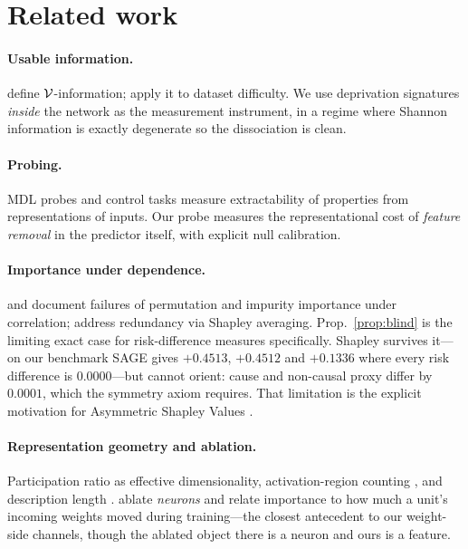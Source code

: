 \section{Related work}\label{sec:related}

\paragraph{Usable information.} \citet{xu2020theory} define
$\mathcal{V}$-information; \citet{ethayarajh2022understanding} apply it to dataset
difficulty. We use deprivation signatures \emph{inside} the network as the
measurement instrument, in a regime where Shannon information is exactly
degenerate so the dissociation is clean.

\paragraph{Probing.} MDL probes \citep{voita2020information} and control tasks
\citep{hewitt2019designing} measure extractability of properties from
representations of inputs. Our probe measures the representational cost of
\emph{feature removal} in the predictor itself, with explicit null calibration.

\paragraph{Importance under dependence.} \citet{strobl2008conditional} and
\citet{hooker2021unrestricted} document failures of permutation and impurity
importance under correlation; \citet{covert2020understanding} address redundancy
via Shapley averaging. Prop.~\ref{prop:blind} is the limiting exact case for
risk-difference measures specifically. Shapley survives it---on our benchmark
SAGE gives $+0.4513$, $+0.4512$ and $+0.1336$ where every risk difference is
$0.0000$---but cannot orient: cause and non-causal proxy differ by $0.0001$,
which the symmetry axiom requires. That limitation is the explicit motivation
for Asymmetric Shapley Values \citep{frye2020asymmetric}.

\paragraph{Representation geometry and ablation.} Participation ratio as
effective dimensionality, activation-region counting
\citep{hanin2019complexity}, and description length \citep{blier2018description}.
\citet{meyes2020under} ablate \emph{neurons} and relate importance to how much a
unit's incoming weights moved during training---the closest antecedent to our
weight-side channels, though the ablated object there is a neuron and ours is a
feature.

